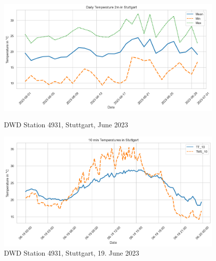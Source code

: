 \begin{figure}[ht]
    \centering
    \includegraphics[width=1\textwidth]{images/dwd_stuttgart_june_23_tair_max_mean_min.png}
    \caption{DWD Station 4931, Stuttgart, June 2023}
    \label{fig:dwd stuttgart june 23 mean min max}

    \includegraphics[width=1\textwidth]{images/dwd_stuttgart_june_19_23_tair.png}
    \caption{DWD Station 4931, Stuttgart, 19. June 2023}
    \label{fig:dwd stuttgart june 23 10 min 2m 5cm}
\end{figure}
